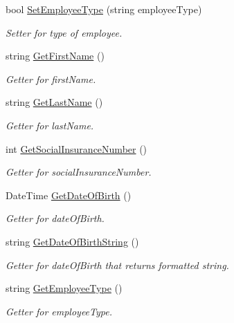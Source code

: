 \begin{DoxyCompactItemize}
bool \hyperlink{class_all_employees_1_1_employee_aabdb35f9e42e4847bc33fda68482f7ab}{Set\+Employee\+Type} (string employee\+Type)
\begin{DoxyCompactList}\small\item\em Setter for type of employee. \end{DoxyCompactList}\item 
string \hyperlink{class_all_employees_1_1_employee_ae585e71d63222bcd0b87581fc8c1f936}{Get\+First\+Name} ()
\begin{DoxyCompactList}\small\item\em Getter for first\+Name. \end{DoxyCompactList}\item 
string \hyperlink{class_all_employees_1_1_employee_afaf5dbaa12c35930b36d3582e831b407}{Get\+Last\+Name} ()
\begin{DoxyCompactList}\small\item\em Getter for last\+Name. \end{DoxyCompactList}\item 
int \hyperlink{class_all_employees_1_1_employee_a0b5c62bd8eca3acd7f0921a478d8aefa}{Get\+Social\+Insurance\+Number} ()
\begin{DoxyCompactList}\small\item\em Getter for social\+Insurance\+Number. \end{DoxyCompactList}\item 
Date\+Time \hyperlink{class_all_employees_1_1_employee_a98f7200d68ab6a59f4e3283b8f81ce28}{Get\+Date\+Of\+Birth} ()
\begin{DoxyCompactList}\small\item\em Getter for date\+Of\+Birth. \end{DoxyCompactList}\item 
string \hyperlink{class_all_employees_1_1_employee_a2c310cf42cb87541a5fde6771e667212}{Get\+Date\+Of\+Birth\+String} ()
\begin{DoxyCompactList}\small\item\em Getter for date\+Of\+Birth that returns formatted string. \end{DoxyCompactList}\item 
string \hyperlink{class_all_employees_1_1_employee_a39116fe8a1dcc18735c92c1a3fcb579e}{Get\+Employee\+Type} ()
\begin{DoxyCompactList}\small\item\em Getter for employee\+Type. \end{DoxyCompactList}\end{DoxyCompactItemize}
